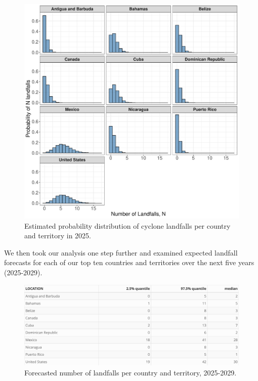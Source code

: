 \documentclass[
]{article}
\begin{document}
\begin{figure}

{\centering \includegraphics[width=0.82\linewidth]{../outputs/bayesian-analysis-country-freq/landfall-per-country-density-plots} 

}

\caption{Estimated probability distribution of cyclone landfalls per country and territory in 2025.}\label{fig:figs7}
\end{figure}

We then took our analysis one step further and examined expected landfall forecasts for each of our top ten countries and territories over the next five years (2025-2029).

\begin{figure}

{\centering \includegraphics[width=1\linewidth]{../outputs/bayesian-analysis-country-freq/simple-landfalls-per-country-forecasts} 

}

\caption{Forecasted number of landfalls per country and territory, 2025-2029.}\label{fig:figs8}
\end{figure}
\end{document}
